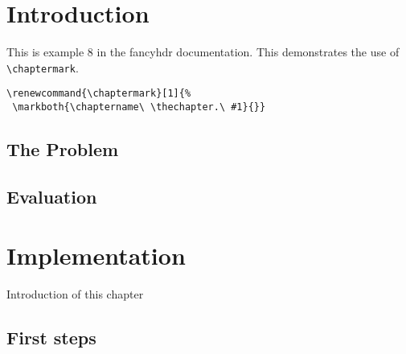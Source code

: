 \documentclass{book}
\renewcommand{\chaptermark}[1]{%
 \markboth{\chaptername\ \thechapter.\ #1}{}}
\begin{document}
\chapter{Introduction}

\begin{boxedminipage}{\textwidth}
This is example 8 in the fancyhdr documentation. 
This demonstrates the use of \verb|\chaptermark|.
\begin{verbatim}
\renewcommand{\chaptermark}[1]{%
 \markboth{\chaptername\ \thechapter.\ #1}{}}
\end{verbatim}
\end{boxedminipage}


\section{The Problem}
\label{sec:problem}

\lipsum[1]

\section{Evaluation}

\lipsum[2]

\chapter{Implementation}

Introduction of this chapter

\lipsum[3]

\section{First steps}
\label{sec:first-steps}

\lipsum
\end{document}
